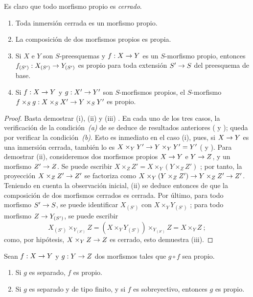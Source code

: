 \documentclass[oneside,10pt]{amsart}
\makeatletter
\newcommand{\ega@arrow}[2]{\mathchoice{#1}{#2}{#2}{#2}}
\renewcommand{\to}{\ega@arrow{\longrightarrow}{\rightarrow}}
\newcommand{\oldpage}[2][]{\marginnote{\normalfont\footnotesize\textbf{#1}~|~#2}\ignorespaces}
\let\EGAOriginalLabel\label
\renewcommand{\label}[1]{\phantomsection\EGAOriginalLabel{#1}}
\makeatother
\begin{document}
Es claro que todo morfismo propio es \emph{cerrado}.

\begin{proposition}[5.4.2]
\label{II.5.4.2-fr}
\medskip\noindent
\begin{enumerate}
  \item[{\rm(i)}] Toda inmersión cerrada es un morfismo propio.
  \item[{\rm(ii)}] La composición de dos morfismos propios es propia.
  \item[{\rm(iii)}] Si $X$ e $Y$ son $S$-preesquemas y $f:X\to Y$ es un $S$-morfismo propio, entonces $f_{(S')}:X_{(S')}\to Y_{(S')}$ es propio para toda extensión $S'\to S$ del preesquema de base.
  \item[{\rm(iv)}] Si $f:X\to Y$ y $g:X'\to Y'$ son $S$-morfismos propios, el $S$-morfismo $f\times_Sg:X\times_SX'\to Y\times_SY'$ es propio.
\end{enumerate}
\end{proposition}

\oldpage[II]{101}
\begin{proof}
Basta demostrar (i), (ii) y (iii) .
En cada uno de los tres casos, la verificación de la condición~\emph{(a)} de  se deduce de resultados anteriores ( y ); queda por verificar la condición~\emph{(b)}.
Esto es inmediato en el caso (i), pues, si $X\to Y$ es una inmersión cerrada, también lo es $X\times_YY'\to Y\times_YY'=Y'$ ( y ).
Para demostrar (ii), consideremos dos morfismos propios $X\to Y$ e $Y\to Z$, y un morfismo $Z'\to Z$.
Se puede escribir $X\times_ZZ'=X\times_Y(Y\times_ZZ')$ ; por tanto, la proyección $X\times_ZZ'\to Z'$ se factoriza como $X\times_Y(Y\times_ZZ')\to Y\times_ZZ'\to Z'$.
Teniendo en cuenta la observación inicial, (ii) se deduce entonces de que la composición de dos morfismos cerrados es cerrada.
Por último, para todo morfismo $S'\to S$, se puede identificar $X_{(S')}$ con $X\times_YY_{(S')}$ ; para todo morfismo $Z\to Y_{(S')}$, se puede escribir
\[
  X_{(S')}\times_{Y_{(S')}}Z
  =(X\times_YY_{(S')})\times_{Y_{(S')}}Z=X\times_YZ~;
\]
como, por hipótesis, $X\times_YZ\to Z$ es cerrado, esto demuestra (iii).
\end{proof}

\begin{corollary}[5.4.3]
\label{II.5.4.3-fr}
Sean $f:X\to Y$ y $g:Y\to Z$ dos morfismos tales que $g\circ f$ sea propio.
\begin{enumerate}
  \item[{\rm(i)}] Si $g$ es separado, $f$ es propio.
  \item[{\rm(ii)}] Si $g$ es separado y de tipo finito, y si $f$ es sobreyectivo, entonces $g$ es propio.
\end{enumerate}
\end{corollary}
\end{document}
